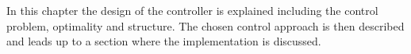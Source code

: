 \vspace{-6mm}
In this chapter the design of the controller is explained including the control problem, optimality and structure. The chosen control approach is then described and leads up to a section where the implementation is discussed. 
\vspace{-4mm}
%
%
%